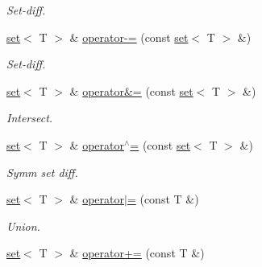 \begin{DoxyCompactItemize}
\begin{DoxyCompactList}\small\item\em Set-\/diff. \end{DoxyCompactList}\item 
\hypertarget{classmerlin_1_1set_a8e5f0d149fec50878e7cc767e683f304}{}\hyperlink{classmerlin_1_1set}{set}$<$ T $>$ \& \hyperlink{classmerlin_1_1set_a8e5f0d149fec50878e7cc767e683f304}{operator-\/=} (const \hyperlink{classmerlin_1_1set}{set}$<$ T $>$ \&)\label{classmerlin_1_1set_a8e5f0d149fec50878e7cc767e683f304}

\begin{DoxyCompactList}\small\item\em Set-\/diff. \end{DoxyCompactList}\item 
\hypertarget{classmerlin_1_1set_a4428ef791cee89dd567785aba416e2e8}{}\hyperlink{classmerlin_1_1set}{set}$<$ T $>$ \& \hyperlink{classmerlin_1_1set_a4428ef791cee89dd567785aba416e2e8}{operator\&=} (const \hyperlink{classmerlin_1_1set}{set}$<$ T $>$ \&)\label{classmerlin_1_1set_a4428ef791cee89dd567785aba416e2e8}

\begin{DoxyCompactList}\small\item\em Intersect. \end{DoxyCompactList}\item 
\hypertarget{classmerlin_1_1set_a18a65ff994f1a9c6bbf2fbca253a2ebf}{}\hyperlink{classmerlin_1_1set}{set}$<$ T $>$ \& \hyperlink{classmerlin_1_1set_a18a65ff994f1a9c6bbf2fbca253a2ebf}{operator$^\wedge$=} (const \hyperlink{classmerlin_1_1set}{set}$<$ T $>$ \&)\label{classmerlin_1_1set_a18a65ff994f1a9c6bbf2fbca253a2ebf}

\begin{DoxyCompactList}\small\item\em Symm set diff. \end{DoxyCompactList}\item 
\hypertarget{classmerlin_1_1set_a40a231741cd7852f3cdf4f8a0e49f691}{}\hyperlink{classmerlin_1_1set}{set}$<$ T $>$ \& \hyperlink{classmerlin_1_1set_a40a231741cd7852f3cdf4f8a0e49f691}{operator$\vert$=} (const T \&)\label{classmerlin_1_1set_a40a231741cd7852f3cdf4f8a0e49f691}

\begin{DoxyCompactList}\small\item\em Union. \end{DoxyCompactList}\item 
\hypertarget{classmerlin_1_1set_a97a67ab3addec83ef5ddff361ba29b7e}{}\hyperlink{classmerlin_1_1set}{set}$<$ T $>$ \& \hyperlink{classmerlin_1_1set_a97a67ab3addec83ef5ddff361ba29b7e}{operator+=} (const T \&)\label{classmerlin_1_1set_a97a67ab3addec83ef5ddff361ba29b7e}


\end{DoxyCompactItemize}
